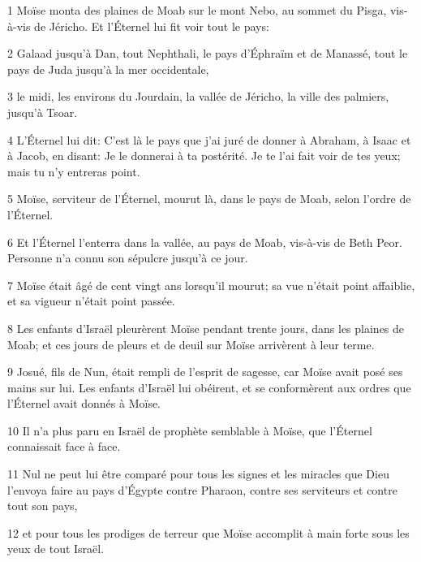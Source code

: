 \par 1 Moïse monta des plaines de Moab sur le mont Nebo, au sommet du Pisga, vis-à-vis de Jéricho. Et l'Éternel lui fit voir tout le pays:
\par 2 Galaad jusqu'à Dan, tout Nephthali, le pays d'Éphraïm et de Manassé, tout le pays de Juda jusqu'à la mer occidentale,
\par 3 le midi, les environs du Jourdain, la vallée de Jéricho, la ville des palmiers, jusqu'à Tsoar.
\par 4 L'Éternel lui dit: C'est là le pays que j'ai juré de donner à Abraham, à Isaac et à Jacob, en disant: Je le donnerai à ta postérité. Je te l'ai fait voir de tes yeux; mais tu n'y entreras point.
\par 5 Moïse, serviteur de l'Éternel, mourut là, dans le pays de Moab, selon l'ordre de l'Éternel.
\par 6 Et l'Éternel l'enterra dans la vallée, au pays de Moab, vis-à-vis de Beth Peor. Personne n'a connu son sépulcre jusqu'à ce jour.
\par 7 Moïse était âgé de cent vingt ans lorsqu'il mourut; sa vue n'était point affaiblie, et sa vigueur n'était point passée.
\par 8 Les enfants d'Israël pleurèrent Moïse pendant trente jours, dans les plaines de Moab; et ces jours de pleurs et de deuil sur Moïse arrivèrent à leur terme.
\par 9 Josué, fils de Nun, était rempli de l'esprit de sagesse, car Moïse avait posé ses mains sur lui. Les enfants d'Israël lui obéirent, et se conformèrent aux ordres que l'Éternel avait donnés à Moïse.
\par 10 Il n'a plus paru en Israël de prophète semblable à Moïse, que l'Éternel connaissait face à face.
\par 11 Nul ne peut lui être comparé pour tous les signes et les miracles que Dieu l'envoya faire au pays d'Égypte contre Pharaon, contre ses serviteurs et contre tout son pays,
\par 12 et pour tous les prodiges de terreur que Moïse accomplit à main forte sous les yeux de tout Israël.


